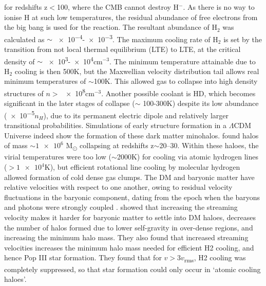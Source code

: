 \documentclass[11pt]{article}
\begin{document}
for redshifts z$<$100, where the CMB cannot destroy  H$^{-}$. As there is no way to ionise H at such low temperatures, the residual abundance of free electrons from the big bang is used for the reaction. The resultant abundance of H$_{2}$ was calculated as  $\sim$ \num{e-4}-\num{e-3}. The maximum cooling rate of H$_{2}$ is set by the transition from not local thermal equilibrium (LTE) to LTE, at the critical density of $\sim$ \num{e3}-\num{e4}cm$^{-3}$. The minimum temperature attainable due to H$_{2}$ cooling is then 500K, but the Maxwellian velocity distribution tail allows real minimum temperatures of $\sim$100K. This allowed gas to collapse into high density structures of $n >$ \num{e8}cm$^{-3}$. Another possible coolant is HD, which becomes significant in the later stages of collapse ($\sim$ 100-300K) despite its low abundance (\num{e-5}$n_{H}$), due to its permanent electric dipole and relatively larger transitional probabilities. 
Simulations of early structure formation in a $\Lambda$CDM Universe indeed show the formation of these dark matter minohalos. \cite{Yoshida2003} found halos of mass $\sim\num{1e6}$ M\textsubscript{\(\odot\)} collapsing at redshifts z$\sim$20–30. Within these haloes, the virial temperatures were too low ($\sim$2000K) for cooling via atomic hydrogen lines ($>\num{1e4}$K), but efficient rotational line cooling by molecular hydrogen allowed formation of cold dense gas clumps. The DM and baryonic matter have relative velocities with respect to one another, owing to residual velocity fluctuations in the baryonic component, dating from the epoch when the baryons and photons were strongly coupled  \citep{Tseliakhovich2010}. \cite{Schauer2019} showed that increasing the streaming velocity makes it harder for baryonic matter to settle into DM haloes, decreases the number of halos formed due to lower self-gravity in over-dense regions, and increasing the minimum halo mass. They also found that increased streaming velocities increases the minimum halo mass needed for efficient H2 cooling, and hence Pop III star formation. They found that for $v>3v$\textsubscript{rms}, H2 cooling was completely suppressed, so that star formation could only occur in ‘atomic cooling haloes’.
\end{document}
